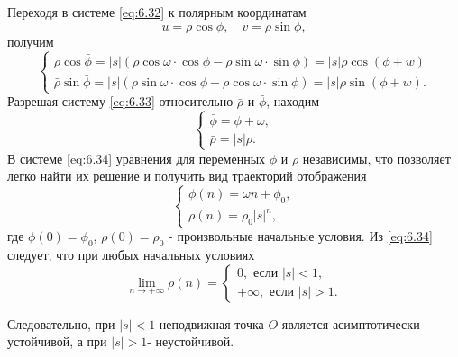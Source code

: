 Переходя в системе \eqref{eq:6.32} к полярным координатам
\begin{equation}
        \label{eq:}
        u = \rho \cos \phi, \quad v = \rho \sin \phi,
\end{equation}
получим
\begin{equation}
        \label{eq:6.33}
        \begin{cases}
                \bar \rho \cos \bar \phi = |s| ( \rho \cos \omega \cdot \cos \phi - \rho \sin \omega \cdot \sin \phi) = |s| \rho \cos(\phi+w) \\
                \bar \rho \sin \bar \phi = |s| (\rho\sin \omega \cdot \cos \phi + \rho \cos \omega \cdot \sin \phi) = |s| \rho \sin(\phi+w).
        \end{cases}
\end{equation}
Разрешая систему \eqref{eq:6.33} относительно $\bar \rho$ и $\bar \phi$, находим
\begin{equation}
        \label{eq:6.34}
        \begin{cases}
                \bar \phi = \phi + \omega ,\\
                \bar \rho = |s| \rho.
        \end{cases}
\end{equation}
В системе \eqref{eq:6.34} уравнения для переменных $\phi$ и $\rho$ независимы, что позволяет легко
найти их решение и получить вид траекторий отображения
\begin{equation}
        \label{eq:6.34}
        \begin{cases}
                \phi(n) = \omega n + \phi_0,\\
                \rho(n) = \rho_0 |s|^n, 
        \end{cases}
\end{equation}
где $\phi(0) = \phi_0$, $\rho(0) = \rho_0$ - произвольные начальные условия. Из \eqref{eq:6.34} следует, что при любых начальных условиях
\begin{equation}
        \label{eq:}
        \lim_{n \to +\infty} \rho(n) = 
\begin{cases}
        0, \text{ если } |s|<1,\\
        +\infty, \text{ если } |s|>1.       
\end{cases}
\end{equation}

Следовательно, при $|s|<1$ неподвижная точка $O$ является асимптотически устойчивой, а при $|s|>1$- неустойчивой.

